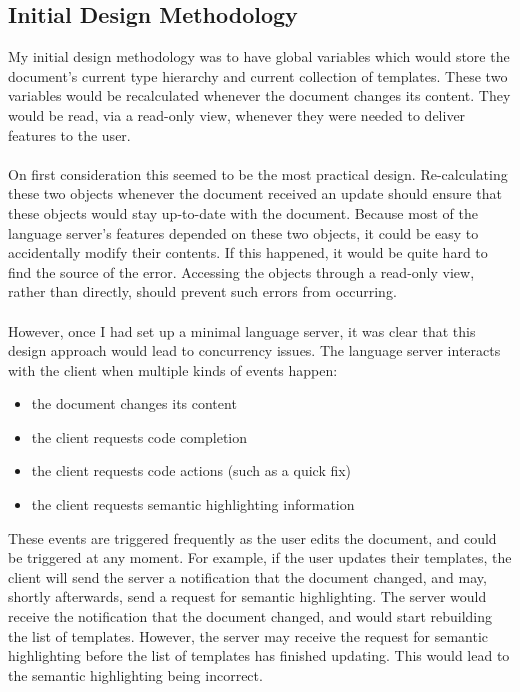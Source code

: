 \documentclass[../main.tex]{subfiles}
\begin{document}
\subsection{Initial Design Methodology}
My initial design methodology was to have global variables which would store the document's current type hierarchy and current collection of templates. These two variables would be recalculated whenever the document changes its content. They would be read, via a read-only view, whenever they were needed to deliver features to the user.
\\
\\
On first consideration this seemed to be the most practical design. Re-calculating these two objects whenever the document received an update should ensure that these objects would stay up-to-date with the document. Because most of the language server's features depended on these two objects, it could be easy to accidentally modify their contents. If this happened, it would be quite hard to find the source of the error. Accessing the objects through a read-only view, rather than directly, should prevent such errors from occurring.
\\
\\
However, once I had set up a minimal language server, it was clear that this design approach would lead to concurrency issues. The language server interacts with the client when multiple kinds of events happen:
\begin{itemize}
    \item the document changes its content
    \item the client requests code completion
    \item the client requests code actions (such as a quick fix)
    \item the client requests semantic highlighting information
\end{itemize}
These events are triggered frequently as the user edits the document, and could be triggered at any moment. For example, if the user updates their templates, the client will send the server a notification that the document changed, and may, shortly afterwards, send a request for semantic highlighting. The server would receive the notification that the document changed, and would start rebuilding the list of templates. However, the server may receive the request for semantic highlighting before the list of templates has finished updating. This would lead to the semantic highlighting being incorrect.
\end{document}
